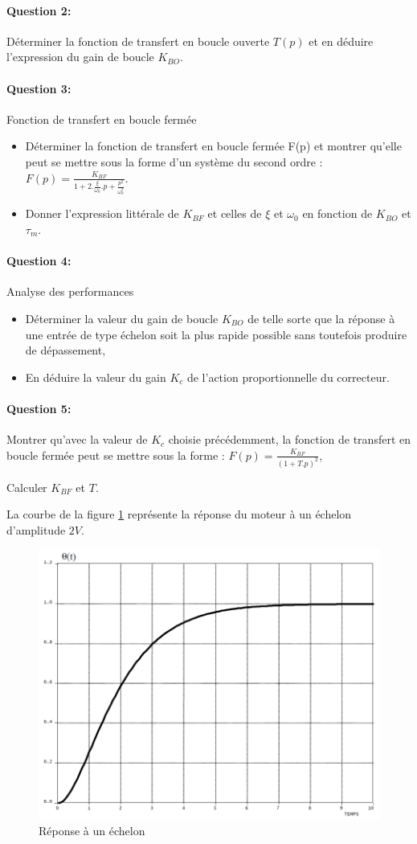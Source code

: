 \paragraph{Question 2:} Déterminer la fonction de transfert en boucle ouverte $T(p)$ et en déduire l'expression du gain de boucle $K_{BO}$.

\paragraph{Question 3:} Fonction de transfert en boucle fermée

\begin{itemize}
 \item Déterminer la fonction de transfert en boucle fermée F(p) et montrer qu'elle peut se mettre sous la forme d'un système du second ordre : $F(p)=\frac{K_{BF}}{1+2.\frac{\xi}{\omega_0}.p+\frac{p^2}{\omega_0^2}}$.
 \item Donner l'expression littérale de $K_{BF}$ et celles de $\xi$ et $\omega_0$ en fonction de $K_{BO}$ et $\tau_m$.
\end{itemize}

\paragraph{Question 4:} Analyse des performances

\begin{itemize}
 \item Déterminer la valeur du gain de boucle $K_{BO}$ de telle sorte que la réponse à une entrée de type échelon soit la plus rapide possible sans toutefois produire de dépassement,
 \item En déduire la valeur du gain $K_c$ de l'action proportionnelle du correcteur.
\end{itemize}

\paragraph{Question 5:} Montrer qu'avec la valeur de $K_c$ choisie précédemment, la fonction de transfert en boucle fermée peut se mettre sous la forme : $F(p)=\frac{K_{BF}}{(1+T.p)^2}$,

Calculer $K_{BF}$ et $T$.

La courbe de la figure \ref{fig23} représente la réponse du moteur à un échelon d'amplitude $2V$.

\begin{figure}[!h]
\centering\includegraphics[width=0.5\linewidth]{img/Tracteur23.png}
\caption{Réponse à un échelon}
\label{fig23}
\end{figure}

